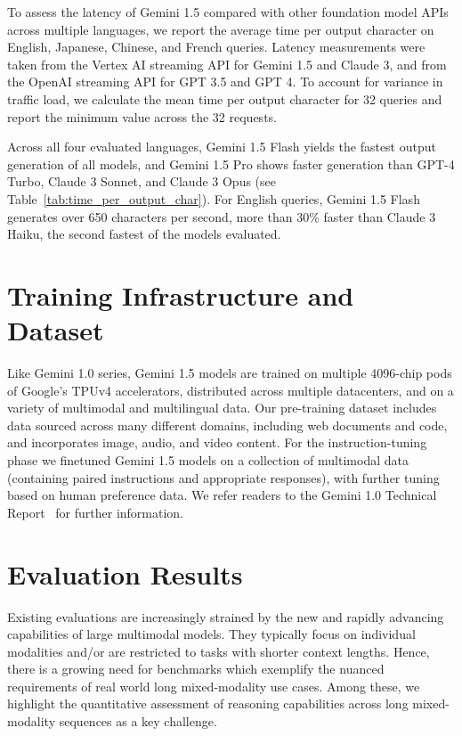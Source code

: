 To assess the latency of Gemini 1.5 compared with other foundation model APIs across multiple languages, we report the average time per output character on English, Japanese, Chinese, and French queries. Latency measurements were taken from the Vertex AI streaming API for Gemini 1.5 and Claude 3, and from the OpenAI streaming API for GPT 3.5 and GPT 4. To account for variance in traffic load, we calculate the mean time per output character for 32 queries and report the minimum value across the 32 requests.

Across all four evaluated languages, Gemini 1.5 Flash yields the fastest output generation of all models, and Gemini 1.5 Pro shows faster generation than GPT-4 Turbo, Claude 3 Sonnet, and Claude 3 Opus (see Table~\ref{tab:time_per_output_char}). For English queries, Gemini 1.5 Flash generates over 650 characters per second, more than 30\% faster than Claude 3 Haiku, the second fastest of the models evaluated.

\section{Training Infrastructure and Dataset}
\label{sec:infra}

Like Gemini 1.0 series, Gemini 1.5 models are trained on multiple 4096-chip pods of Google's TPUv4 accelerators, distributed across multiple datacenters, and on a variety of multimodal and multilingual data. Our pre-training dataset includes data sourced across many different domains, including web documents and code, and incorporates image, audio, and video content. For the instruction-tuning phase we finetuned Gemini 1.5 models on a collection of multimodal data (containing paired instructions and appropriate responses), with further tuning based on human preference data. We refer readers to the Gemini 1.0 Technical Report~\cite{geminiteam2023gemini} for further information. 

\section{Evaluation Results}
\label{sec:eval}

Existing evaluations are increasingly strained by the new and rapidly advancing capabilities of large multimodal models. They typically focus on individual modalities and/or are restricted to tasks with shorter context lengths. Hence, there is a growing need for benchmarks which exemplify the nuanced requirements of real world long mixed-modality use cases. Among these, we highlight the quantitative assessment of reasoning capabilities across long mixed-modality sequences as a key challenge.

